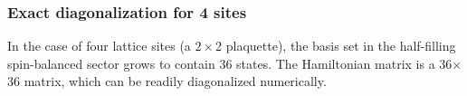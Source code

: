 \subsubsection { Exact diagonalization for 4 sites } 

In the case of four lattice sites (a $2\times$2 plaquette), the basis set in the
half-filling spin-balanced sector grows to contain 36 states.   The Hamiltonian
matrix is a 36$\times$36 matrix, which can be readily diagonalized numerically.
